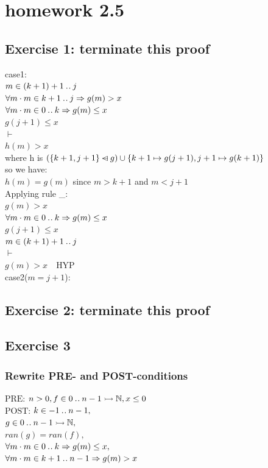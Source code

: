 \documentclass[11pt,a4paper,fleqn]{article}
\begin{document}
\section{homework 2.5}
\subsection{Exercise 1: terminate this proof}
\noindent
case1:\\
$m \in (k + 1)+1 \mathbin{.\mkern1mu.} j$\\
$\forall m \cdot m \in k+1 \mathbin{.\mkern1mu.} j \Rightarrow g(m) > x  $\\
$\forall m \cdot m \in 0 \mathbin{.\mkern1mu.} k \Rightarrow g(m) \leq x $\\
$g(j+1) \leq x $\\
$\vdash$\\
$h(m)>x $\\

\noindent
where h is $ (\{k+1, j+1\} \mathbin{\lhd\mkern-14mu-} g) \cup\{k+1 \mapsto g(j+1), j+1 \mapsto g(k+1)\}$\\
\noindent so we have:\\
$h(m) = g(m)$ since $m>k+1 $ and $m<j+1$\\ 
\noindent Applying rule \_:\\
$g(m)>x $\\
$ \forall m \cdot m \in 0 \mathbin{.\mkern1mu.} k \Rightarrow g(m) \leq x $\\
$g(j+1) \leq x $\\
$m \in (k + 1)+1 \mathbin{.\mkern1mu.} j$\\
$\vdash$\\
$g(m)>x \quad \text{HYP}$\\

\noindent
case2($m = j+1 $):\\



\subsection{Exercise 2: terminate this proof}
\noindent




\subsection{Exercise 3}

\subsubsection{Rewrite PRE- and POST-conditions}
\noindent
$\text{PRE:}$
$ n>0,f\in 0\mathbin{.\mkern1mu.} n-1\rightarrowtail \mathbb{N},x\leq 0$\\
$\text{POST:}$
$k\in -1\mathbin{.\mkern1mu.} n-1,$\\
$g\in 0\mathbin{.\mkern1mu.} n-1\rightarrowtail\mathbb{N},$\\
$ran(g)=ran(f),$\\
$ \forall m \cdot m \in 0 \mathbin{.\mkern1mu.} k \Rightarrow g(m) \leq x ,$\\
$ \forall m \cdot m \in k+1 \mathbin{.\mkern1mu.} n-1 \Rightarrow g(m)>x$\\
\end{document}
